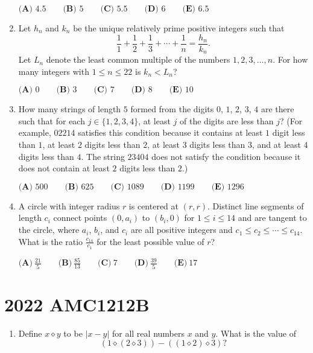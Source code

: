 \documentclass{article}
\begin{document}
\begin{enumerate}[label=\arabic*., itemsep=0.5em]
$\textbf{(A) }4.5 \qquad\textbf{(B) }5 \qquad\textbf{(C) }5.5 \qquad\textbf{(D) }6\qquad\textbf{(E) }6.5$\par \vspace{0.5em}\item Let $h_n$ and $k_n$ be the unique relatively prime positive integers such that 
\begin{equation*}
\frac{1}{1}+\frac{1}{2}+\frac{1}{3}+\cdots+\frac{1}{n}=\frac{h_n}{k_n}.
\end{equation*}
 Let $L_n$ denote the least common multiple of the numbers $1, 2, 3, \ldots, n$. For how many integers with $1\le{n}\le{22}$ is $k_n<L_n$?

$\textbf{(A) }0 \qquad\textbf{(B) }3 \qquad\textbf{(C) }7 \qquad\textbf{(D) }8\qquad\textbf{(E) }10$\par \vspace{0.5em}\item How many strings of length $5$ formed from the digits $0$, $1$, $2$, $3$, $4$ are there such that for each $j \in \{1,2,3,4\}$, at least $j$ of the digits are less than $j$? (For example, $02214$ satisfies this condition
because it contains at least $1$ digit less than $1$, at least $2$ digits less than $2$, at least $3$ digits less
than $3$, and at least $4$ digits less than $4$. The string $23404$ does not satisfy the condition because it
does not contain at least $2$ digits less than $2$.)

$\textbf{(A) }500\qquad\textbf{(B) }625\qquad\textbf{(C) }1089\qquad\textbf{(D) }1199\qquad\textbf{(E) }1296$\par \vspace{0.5em}\item A circle with integer radius $r$ is centered at $(r, r)$. Distinct line segments of length $c_i$ connect points $(0, a_i)$ to $(b_i, 0)$ for $1 \le i \le 14$ and are tangent to the circle, where $a_i$, $b_i$, and $c_i$ are all positive integers and $c_1 \le c_2 \le \cdots \le c_{14}$. What is the ratio $\frac{c_{14}}{c_1}$ for the least possible value of $r$?

$\textbf{(A)} ~\frac{21}{5} \qquad\textbf{(B)} ~\frac{85}{13} \qquad\textbf{(C)} ~7 \qquad\textbf{(D)} ~\frac{39}{5} \qquad\textbf{(E)} ~17 $\par \vspace{0.5em}\end{enumerate}\newpage\section*{2022 AMC1212B}\begin{enumerate}[label=\arabic*., itemsep=0.5em]\item Define $x\diamond y$ to be $|x-y|$ for all real numbers $x$ and $y.$ What is the value of 
\begin{equation*}
(1\diamond(2\diamond3))-((1\diamond2)\diamond3)?
\end{equation*}



\end{enumerate}
\end{document}
